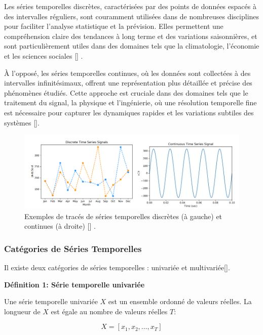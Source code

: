 Les séries temporelles discrètes, caractérisées par des points de données
espacés à des intervalles réguliers, sont couramment utilisées dans de
nombreuses disciplines pour faciliter l'analyse statistique et la prévision.
Elles permettent une compréhension claire des tendances à long terme et des
variations saisonnières, et sont particulièrement utiles dans des domaines tels
que la climatologie, l'économie et les sciences sociales [\cite{brophy2023gan}]
.

À l'opposé, les séries temporelles continues, où les données sont collectées à des
intervalles infinitésimaux, offrent une représentation plus détaillée et précise des
phénomènes étudiés. Cette approche est cruciale dans des domaines tels que le traitement
du signal, la physique et l'ingénierie, où une résolution temporelle fine est nécessaire
pour capturer les dynamiques rapides et les variations subtiles des systèmes [\cite{brophy2023gan}].

\begin{figure}[hbt!]
	\centering
	\includegraphics[width=12cm]{images_pfe/timeseries.png}
	\caption{
		Exemples de tracés de séries temporelles discrètes (à gauche) et continues (à droite) [\cite{brophy2023gan}] .}
	\label{fig:time-series}
\end{figure}
\FloatBarrier

\subsubsection{Catégories de Séries Temporelles}

Il existe deux catégories de séries temporelles : univariée et
multivariée[\cite{fawaz2019deep}].

\textbf{Définition 1: Série temporelle univariée}

Une série temporelle univariée $X$ est un ensemble ordonné de valeurs réelles.
La longueur de $X$ est égale au nombre de valeurs réelles $T$:

\begin{equation}
	X = [x_1, x_2, \ldots, x_T]
\end{equation}

